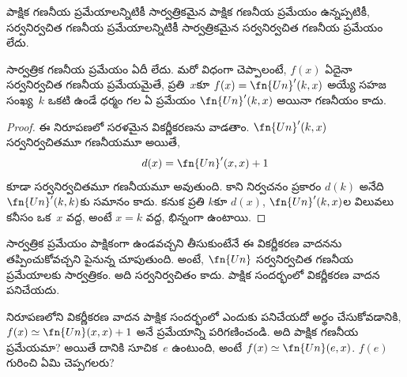 \documentclass[../../../include/open-logic-section]{subfiles}
\begin{document}

పాక్షిక గణనీయ ప్రమేయాలన్నిటికీ సార్వత్రికమైన పాక్షిక గణనీయ ప్రమేయం
ఉన్నప్పటికీ, సర్వనిర్వచిత గణనీయ ప్రమేయాలన్నిటికీ సార్వత్రికమైన
సర్వనిర్వచిత గణనీయ ప్రమేయం లేదు.

\begin{thm}
సార్వత్రిక గణనీయ ప్రమేయం ఏదీ లేదు. మరో విధంగా చెప్పాలంటే, $f(x)$
ఏదైనా సర్వనిర్వచిత గణనీయ ప్రమేయమైతే, ప్రతి~$x$కూ
$f(x)=\fn{Un}'(k,x)$ అయ్యే సహజ సంఖ్య~$k$ ఒకటి ఉండే ధర్మం గల ఏ
ప్రమేయం $\fn{Un}'(k,x)$ అయినా గణనీయం కాదు.
\end{thm}

\begin{proof}
ఈ నిరూపణలో సరళమైన వికర్ణీకరణను వాడతాం. $\fn{Un}'(k,x)$ సర్వనిర్వచితమూ
గణనీయమూ అయితే,
\[
d(x)=\fn{Un}'(x,x)+1
\]
కూడా సర్వనిర్వచితమూ గణనీయమూ అవుతుంది. కాని నిర్వచనం ప్రకారం
$d(k)$ అనేది $\fn{Un}'(k,k)$కు సమానం కాదు. కనుక ప్రతి $k$కూ
$d(x)$, $\fn{Un}'(k,x)$ల విలువలు కనీసం ఒక~$x$ వద్ద, అంటే $x=k$
వద్ద, భిన్నంగా ఉంటాయి.
\end{proof}

\begin{explain}
సార్వత్రిక ప్రమేయం పాక్షికంగా ఉండవచ్చని తీసుకుంటేనే ఈ వికర్ణీకరణ
వాదనను తప్పించుకోవచ్చని పైనున్న  చూపుతుంది. అంటే, $\fn{Un}$ సర్వనిర్వచిత గణనీయ
ప్రమేయాలకు సార్వత్రికం. అది సర్వనిర్వచితం కాదు. పాక్షిక
సందర్భంలో వికర్ణీకరణ వాదన పనిచేయదు.
\end{explain}

\begin{prob}
   నిరూపణలోని వికర్ణీకరణ వాదన పాక్షిక సందర్భంలో
  ఎందుకు పనిచేయదో అర్థం చేసుకోవడానికి, $f(x)\simeq
  \fn{Un}(x,x)+1$ అనే ప్రమేయాన్ని పరిగణించండి. అది పాక్షిక గణనీయ
  ప్రమేయమా? అయితే దానికి సూచిక~$e$ ఉంటుంది, అంటే $f(x)\simeq
  \fn{Un}(e,x)$. $f(e)$ గురించి ఏమి చెప్పగలరు?
\end{prob}
\end{document}
